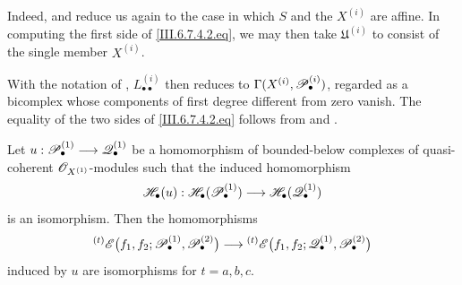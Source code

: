 \begin{remark}[6.7.4]
Indeed,  and  reduce us again to
the case in which $S$ and the $X^{(i)}$ are affine.  In
computing the first side of \eqref{III.6.7.4.2.eq}, we may then
take $\mathfrak U^{(i)}$ to consist of the single member
$X^{(i)}$.


With the notation of ,
$L_{\bullet\bullet}^{(i)}$ then reduces to $\Gamma(X^{(i)},\mathscr{P}_\bullet^{(i)})$,
regarded as a bicomplex whose components of first degree
different from zero vanish.  The equality of the two sides of
\eqref{III.6.7.4.2.eq} follows from  and
.
\end{remark}

\begin{proposition}[6.7.5]
\label{III.6.7.5}
Let $u:\mathscr{P}_\bullet^{(1)}
\longrightarrow
\mathscr{Q}_\bullet^{(1)}$
be a homomorphism of bounded-below complexes of quasi-coherent
$\mathscr{O}_{X^{(1)}}$-modules such that the induced homomorphism
\[
  \mathscr{H}_\bullet(u):
  \mathscr{H}_\bullet(\mathscr{P}_\bullet^{(1)})
  \longrightarrow
  \mathscr{H}_\bullet(\mathscr{Q}_\bullet^{(1)})
\]
is an isomorphism.  Then the homomorphisms
\[
  {}^{(t)}\mathscr{E}
  \bigl(
    f_1,f_2;
    \mathscr{P}_\bullet^{(1)},\mathscr{P}_\bullet^{(2)}
  \bigr)
  \longrightarrow
  {}^{(t)}\mathscr{E}
  \bigl(
    f_1,f_2;
    \mathscr{Q}_\bullet^{(1)},\mathscr{P}_\bullet^{(2)}
  \bigr)
\]
induced by $u$ are isomorphisms for $t=a,b,c$.
\end{proposition}

